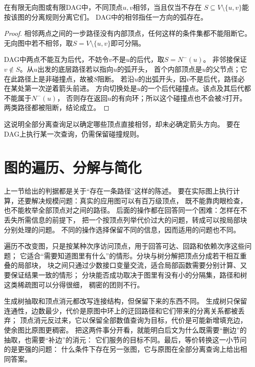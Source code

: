 \begin{lemma}[分离关系中的邻接判据]
  \label{lem:graph-theory-separation-adjacency}
  在有限无向图或有限DAG中，不同顶点\(u,v\)相邻，当且仅当不存在
  \(S\subseteq V\setminus\{u,v\}\)能按该图的分离规则分离它们。
  DAG中的相邻指任一方向的弧存在。
\end{lemma}

\begin{proof}
相邻两点之间的一步路径没有内部顶点，任何这样的条件集都不能阻断它。
无向图中若不相邻，取\(S=V\setminus\{u,v\}\)即可分隔。

DAG中两点不能互为后代，不妨令\(v\)不是\(u\)的后代，取\(S=N^-(u)\)。
非邻接保证\(v\notin S\)。从\(u\)出发的底层路径若以指向\(u\)的弧开头，
首个内部顶点是\(u\)的父节点；它在此路径上是非碰撞点，故被\(S\)阻断。
若沿\(u\)的出弧开头，因\(v\)不是后代，路径必在某处第一次逆着箭头前进。
方向切换处是\(u\)的一个后代碰撞点。该点及其后代都不能属于\(N^-(u)\)，
否则存在返回\(u\)的有向环；所以这个碰撞点也不会被\(S\)打开。
两类路径都被阻断，结论成立。
\end{proof}

这说明全部分离查询足以确定哪些顶点直接相邻，却未必确定箭头方向。
要在DAG上执行某一次查询，仍需保留碰撞规则。

\section{图的遍历、分解与简化}
\label{sec:graph-theory-traversal-separation-decomposition}

上一节给出的判据都是关于“存在一条路径”这样的陈述。
要在实际图上执行计算，还要解决规模问题：真实的应用图可以有百万级顶点，
既不能靠肉眼检查，也不能枚举全部顶点对之间的路径。
后面的操作都在回答同一个困难：怎样在不丢失所需信息的前提下，
把一个按顶点列举代价过大的问题，转成可以按局部块分别处理的问题。
不同的操作选择保留不同的信息，因而适用的问题也不同。

遍历不改变图，只是按某种次序访问顶点，用于回答可达、回路和依赖次序这些问题；
它适合“需要知道图里有什么”的情形。分块与树分解把顶点分成若干相互重叠的局部块，
块之间只通过少数接口变量交流，适合局部函数需要分别计算、又要保证结果一致的情形；
分块能否成功取决于图里有没有小的分隔集，路径和树这类稀疏图可以分得很细，
稠密的团则不行。

生成树抽取和顶点消元都改写连接结构，但保留下来的东西不同。
生成树只保留连通性，边数最少，代价是原图中环上的迂回路径和它们带来的分离关系都被丢弃；
顶点消元反过来，它以保留全部数值查询为目标，代价是可能新增填充边，
使余图比原图更稠密。
把这两件事分开看，就能明白后文为什么既需要“删边”的抽取，也需要“补边”的消元：
它们服务的目标不同。最后，等价转换这一小节问的是更强的问题：
什么条件下存在另一张图，它与原图在全部分离查询上给出相同答案。

